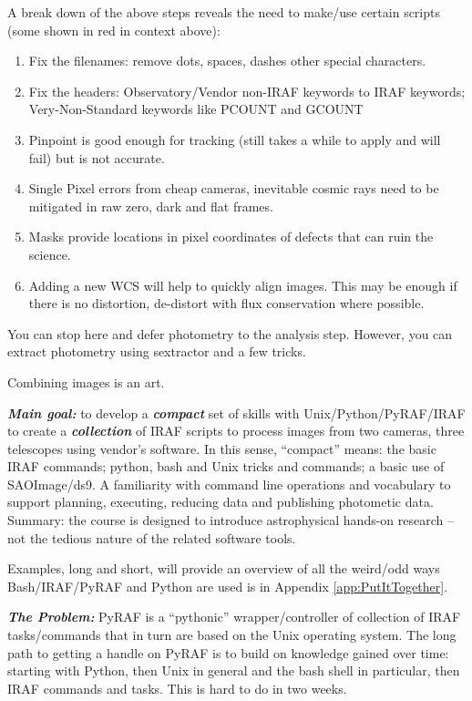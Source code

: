 \documentclass[letter,11pt,oneside]{article}
\begin{document}
A break down of the above steps reveals the need to make/use
certain scripts (some shown in red in context above):

\vspace{-.15cm}
\begin{enumerate}[resume]\addtolength{\itemsep}{-0.5\baselineskip}
   \item   Fix the filenames: remove dots, spaces, dashes other special characters.
   \item   Fix the headers: Observatory/Vendor non-IRAF keywords to IRAF
keywords; Very-Non-Standard keywords like PCOUNT and GCOUNT
   \item   Pinpoint is good enough for tracking (still takes a while to apply
and will fail) but is not accurate.
   \item   Single Pixel errors from cheap cameras, inevitable cosmic rays need
to be mitigated in raw zero, dark and flat frames.
   \item   Masks provide locations in pixel coordinates of defects that can ruin
the science.
   \item   Adding a new WCS will help to quickly align images. This may be enough
if there is no distortion, de-distort with flux conservation where possible.
\end{enumerate}


You can stop here and defer photometry to the analysis step. However,
you can extract photometry using sextractor and a few tricks.

Combining images is an art.


\textbf{\emph{Main goal:}} to develop a \textbf{\emph{compact}} set of
skills with Unix/Python/PyRAF/IRAF to create a
\textbf{\emph{collection}} of IRAF scripts to process images from two
cameras, three telescopes using vendor's software. In this sense,
``compact'' means: the basic IRAF commands; python, bash and Unix
tricks and commands; a basic use of SAOImage/ds9. A familiarity with
command line operations and vocabulary to support planning, executing,
reducing data and publishing photometic data. Summary: the course is
designed to introduce astrophysical hands-on research -- not the
tedious nature of the related software tools.

Examples, long and short, will provide an overview of all the weird/odd ways
Bash/IRAF/PyRAF and Python are used is in Appendix \ref{app:PutItTogether}.

\textbf{\emph{The Problem:}} PyRAF is a ``pythonic''
wrapper/controller of collection of IRAF tasks/commands that in turn
are based on the Unix operating system. The long path to getting a
handle on PyRAF is to build on knowledge gained over time: starting
with Python, then Unix in general and the bash shell in particular,
then IRAF commands and tasks. This is hard to do in two weeks.
\end{document}
